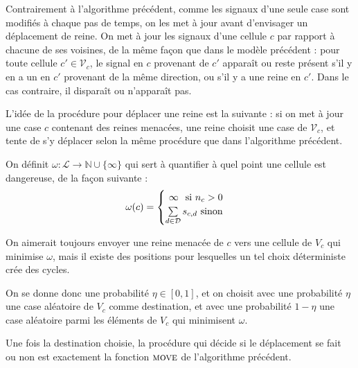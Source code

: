 \documentclass[11pt, openany]{article}
\newcommand{\N}{\mathbb{N}}
\newcommand{\La}{\mathcal{L}}
\newcommand{\D}{\mathcal{D}}
\newcommand{\M}{\textsc{move}}
\newcommand{\E}{\mathcal{E}}
\newcommand{\V}{\mathcal V}
\begin{document}

\bigskip

Contrairement à l'algorithme précédent, comme les signaux d'une seule case sont modifiés à chaque pas de temps, on les met à jour avant d'envisager un déplacement de reine. On met à jour les signaux d'une cellule $c$ par rapport à chacune de ses voisines, de la même façon que dans le modèle précédent : pour toute cellule $c'\in\V_c$, le signal en $c$ provenant de $c'$ apparaît ou reste présent s'il y en a un en $c'$ provenant de la même direction, ou s'il y a une reine en $c'$. Dans le cas contraire, il disparaît ou n'apparaît pas.
\bigskip

L'idée de la procédure pour déplacer une reine est la suivante : si on met à jour une case $c$ contenant des reines menacées, une reine choisit une case de $\V_c$, et tente de s'y déplacer selon la même procédure que dans l'algorithme précédent. 

On définit $\omega : \La\to\N\cup\{\infty\}$ qui sert à quantifier à quel point une cellule est dangereuse, de la façon suivante : \[
\omega(c) = 
\begin{cases}
  \hfill \infty \hfill \text{ si $n_c > 0$}\\
  \hfill \sum\limits_{d\in\D}s_{c,d} \hfill \text{ sinon}
\end{cases}
\]

On aimerait toujours envoyer une reine menacée de $c$ vers une cellule de $V_c$ qui minimise $\omega$, mais il existe des positions pour lesquelles un tel choix déterministe crée des cycles. 


On se donne donc une probabilité $\eta \in [0,1]$, et on choisit avec une probabilité $\eta$ une case aléatoire de $V_c$ comme destination, et avec une probabilité $1 - \eta$ une case aléatoire parmi les éléments de $V_c$ qui minimisent $\omega$.

Une fois la destination choisie, la procédure qui décide si le déplacement se fait ou non est exactement la fonction $\M$ de l'algorithme précédent.

\bigskip
\end{document}
